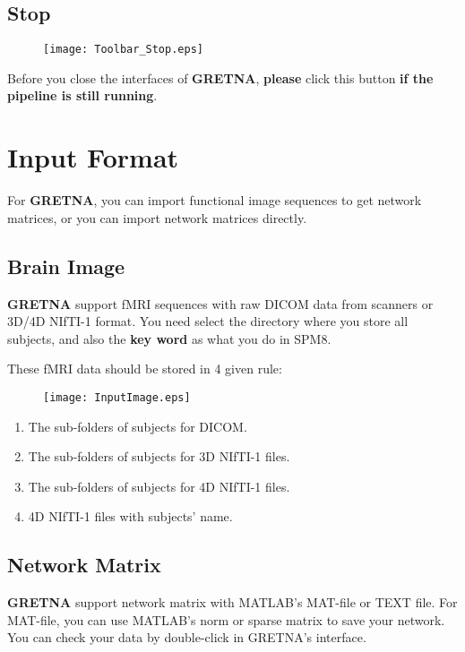 \documentclass[11pt]{article}
\begin{document}
		\subsection{Stop}
			\begin{figure}
				\begin{center}
					\texttt{[image: Toolbar\_Stop.eps]}
				\end{center}
			\end{figure}
			Before you close the interfaces of \textbf{GRETNA}, 
			\textbf{please} click this button \textbf{if the pipeline is still running}.
	\section{Input Format}
		For \textbf{GRETNA}, you can import functional image sequences to get network matrices, 
		or you can import network matrices directly. 
		\subsection{Brain Image}
			\textbf{GRETNA} support fMRI sequences with raw DICOM data from scanners or 3D/4D NIfTI-1 format.
			You need select the directory where you store all subjects, 
			and also the \textbf{key word} as what you do in SPM8.

			These fMRI data should be stored in 4 given rule:
			\begin{figure}
				\begin{center}
					\texttt{[image: InputImage.eps]}
				\end{center}
			\end{figure}
			\begin{enumerate}
				\item The sub-folders of subjects for DICOM.
				\item The sub-folders of subjects for 3D NIfTI-1 files.
				\item The sub-folders of subjects for 4D NIfTI-1 files.
				\item 4D NIfTI-1 files with subjects' name.
			\end{enumerate}		
		\subsection{Network Matrix}
			\textbf{GRETNA} support network matrix with MATLAB's MAT-file or TEXT file.
			For MAT-file, you can use MATLAB's norm or sparse matrix to save your network.
			You can check your data by double-click in GRETNA's interface.
\end{document}
